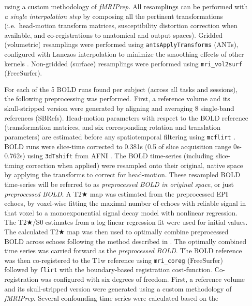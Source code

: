 \documentclass[
]{article}
\begin{document}
\begin{description}
using a custom methodology of \emph{fMRIPrep}. All resamplings can be
performed with \emph{a single interpolation step} by composing all the
pertinent transformations (i.e.~head-motion transform matrices,
susceptibility distortion correction when available, and
co-registrations to anatomical and output spaces). Gridded (volumetric)
resamplings were performed using \texttt{antsApplyTransforms} (ANTs),
configured with Lanczos interpolation to minimize the smoothing effects
of other kernels \citep{lanczos}. Non-gridded (surface) resamplings were
performed using \texttt{mri\_vol2surf} (FreeSurfer).
\item[Functional data preprocessing]
For each of the 5 BOLD runs found per subject (across all tasks and
sessions), the following preprocessing was performed. First, a reference
volume and its skull-stripped version were generated by aligning and
averaging 8 single-band references (SBRefs). Head-motion parameters with
respect to the BOLD reference (transformation matrices, and six
corresponding rotation and translation parameters) are estimated before
any spatiotemporal filtering using \texttt{mcflirt} \citep[FSL
6.0.5.1:57b01774,][]{mcflirt}. BOLD runs were slice-time corrected to
0.381s (0.5 of slice acquisition range 0s-0.762s) using
\texttt{3dTshift} from AFNI \citep[RRID:SCR\_005927]{afni}. The BOLD
time-series (including slice-timing correction when applied) were
resampled onto their original, native space by applying the transforms
to correct for head-motion. These resampled BOLD time-series will be
referred to as \emph{preprocessed BOLD in original space}, or just
\emph{preprocessed BOLD}. A T2★ map was estimated from the preprocessed
EPI echoes, by voxel-wise fitting the maximal number of echoes with
reliable signal in that voxel to a monoexponential signal decay model
with nonlinear regression. The T2★/S0 estimates from a log-linear
regression fit were used for initial values. The calculated T2★ map was
then used to optimally combine preprocessed BOLD across echoes following
the method described in \citep{posse_t2s}. The optimally combined time
series was carried forward as the \emph{preprocessed BOLD}. The BOLD
reference was then co-registered to the T1w reference using
\texttt{mri\_coreg} (FreeSurfer) followed by \texttt{flirt} \citep[FSL
6.0.5.1:57b01774,][]{flirt} with the boundary-based registration
\citep{bbr} cost-function. Co-registration was configured with six
degrees of freedom. First, a reference volume and its skull-stripped
version were generated using a custom methodology of \emph{fMRIPrep}.
Several confounding time-series were calculated based on the

\end{description}
\end{document}
